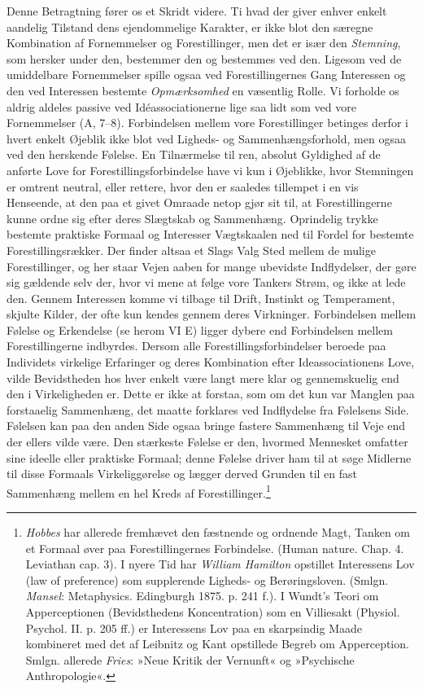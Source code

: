 \documentclass[12pt,a4paper,openany]{book}
\newcommand{\opage}[1]{\marginnote{\footnotesize\textit{[#1]}}}
\begin{document}
Denne Betragtning fører os et Skridt videre. Ti hvad der giver enhver
enkelt aandelig Tilstand dens ejendommelige Karakter, er ikke blot den
særegne Kombination af Fornemmelser og Forestillinger, men det er især
den \emph{Stemning}, som hersker under den, bestemmer den og bestemmes
ved den. Ligesom ved de umiddelbare Fornemmelser spille ogsaa ved
Forestillingernes Gang Interessen og den ved Interessen bestemte
\emph{Opmærksomhed} en væsentlig Rolle. Vi forholde os aldrig aldeles
passive ved Idéassociationerne lige saa lidt som ved vore Fornemmelser
(A, 7--8). Forbindelsen mellem vore Forestillinger betinges derfor i
hvert enkelt Øjeblik ikke blot ved Ligheds- og Sammenhængsforhold, men
ogsaa ved den herskende Følelse. En Tilnærmelse til ren, absolut
Gyldighed af de anførte Love for Forestillingsforbindelse have vi kun i
Øjeblikke, hvor Stemningen er omtrent neutral, eller rettere, hvor den
er saaledes tillempet i en vis Henseende, at den paa et givet Omraade
netop gjør sit til, at Forestillingerne kunne ordne sig efter deres
Slægtskab og Sammenhæng. Oprindelig trykke bestemte praktiske Formaal og
Interesser Vægtskaalen ned til Fordel for bestemte Forestillingsrækker.
Der finder altsaa et Slags Valg Sted mellem de mulige Forestillinger, og
her staar Vejen aaben for mange ubevidste Indflydelser, der gøre sig
gældende selv der, hvor vi mene at følge vore Tankers Strøm, og ikke at
lede den. Gennem Interessen komme vi tilbage til Drift, Instinkt og
Temperament, skjulte Kilder, der ofte kun kendes gennem deres
Virkninger. Forbindelsen mellem Følelse og Erkendelse (se herom VI E)
ligger dybere end Forbindelsen mellem Forestillingerne indbyrdes. Dersom
alle Forestillingsforbindelser beroede paa Individets virkelige
Erfaringer og deres Kombination efter Ideassociationens Love, vilde
Bevidstheden hos hver enkelt være langt mere klar og gennemskuelig end
den i Virkeligheden er. Dette er ikke at forstaa, som om det kun var
Manglen paa forstaaelig Sammenhæng, det maatte
\opage{195}forklares ved Indflydelse fra Følelsens Side. Følelsen kan
paa den anden Side ogsaa bringe fastere Sammenhæng til Veje end der
ellers vilde være. Den stærkeste Følelse er den, hvormed Mennesket
omfatter sine ideelle eller praktiske Formaal; denne Følelse driver ham
til at søge Midlerne til disse Formaals Virkeliggørelse og lægger derved
Grunden til en fast Sammenhæng mellem en hel Kreds af
Forestillinger.\footnote[1]{\emph{Hobbes} har allerede fremhævet den
fæstnende og ordnende Magt, Tanken om et Formaal øver paa
Forestillingernes Forbindelse. (Human nature. Chap. 4. Leviathan cap.
3). I nyere Tid har \emph{William Hamilton} opstillet Interessens Lov
(law of preference) som supplerende Ligheds- og Berøringsloven. (Smlgn.
\emph{Mansel}: Metaphysics. Edingburgh 1875. p. 241 f.). I Wundt’s Teori
om Apperceptionen (Bevidsthedens Koncentration) som en Villiesakt
(Physiol. Psychol. II. p. 205 ff.) er Interessens Lov paa en skarpsindig
Maade kombineret med det af Leibnitz og Kant opstillede Begreb om
Apperception. Smlgn. allerede \emph{Fries}: »Neue Kritik der Vernunft«
og »Psychische Anthropologie«.}
\end{document}
